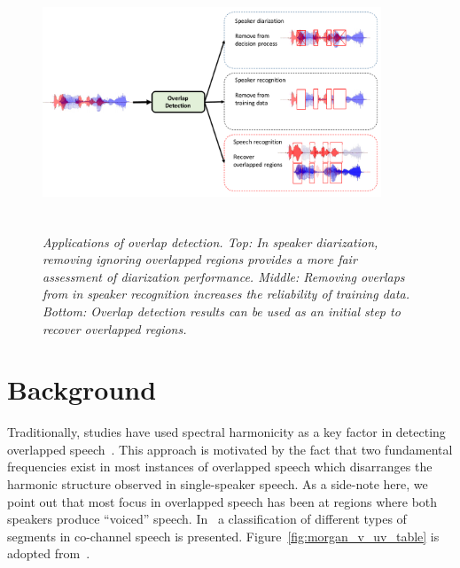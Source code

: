 \begin{figure}[h!]
	\centering
	\vspace{0mm}
	\includegraphics[height = 3in, width=0.9\textwidth]{figures/overlap_detection_applications}
	\vspace{-3mm}
	\caption{\it Applications of overlap detection. Top: In speaker diarization, removing ignoring overlapped regions provides a more fair assessment of diarization performance. Middle: Removing overlaps from in speaker recognition increases the reliability of training data. Bottom: Overlap detection results can be used as an initial step to recover overlapped regions.}
	\label{fig:overlap_applications}
	\vspace{-3mm}
\end{figure}


\newpage
\section{Background}
\label{sec:ch2_methods}

Traditionally, studies have used spectral harmonicity as a key factor in detecting overlapped speech~\cite{nav_icassp13,smolenski_tut}. 
This approach is motivated by the fact that two fundamental frequencies exist in most instances of overlapped speech which disarranges the harmonic structure observed in single-speaker speech. 
As a side-note here, we point out that most focus in overlapped speech has been at regions where both speakers produce ``voiced'' speech. In~\cite{morgan_cochannel} a classification of different types of segments in co-channel speech is presented. Figure~\ref{fig:morgan_v_uv_table} is adopted from~\cite{morgan_cochannel}. 

